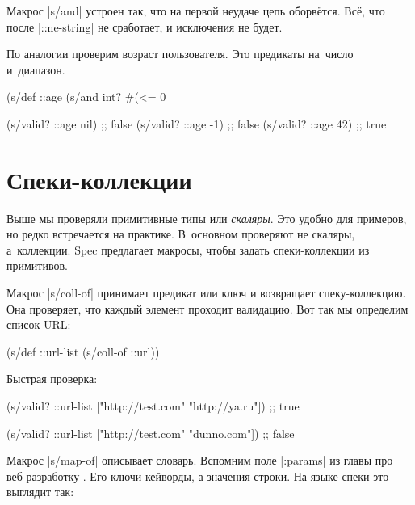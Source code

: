 Макрос \spverb|s/and| устроен так, что на первой неудаче цепь
оборв\"{е}тся. Вс\"{е}, что после \spverb|::ne-string| не сработает, и
исключения не будет.

По аналогии проверим возраст пользователя. Это предикаты на~число и~диапазон.


\begin{english}
  \begin{clojure}
(s/def ::age
  (s/and int? #(<= 0 %

(s/valid? ::age nil) ;; false
(s/valid? ::age -1)  ;; false
(s/valid? ::age 42)  ;; true
  \end{clojure}
\end{english}

\section{Спеки-коллекции}


Выше мы проверяли примитивные типы или \emph{скаляры}. Это удобно для примеров,
но редко встречается на практике. В~основном проверяют не скаляры,
а~коллекции. Spec предлагает макросы, чтобы задать спеки-коллекции из
примитивов.


Макрос \spverb|s/coll-of| принимает предикат или ключ и возвращает
спеку-коллекцию. Она проверяет, что каждый элемент проходит валидацию. Вот так
мы определим список URL:

\begin{english}
  \begin{clojure}
(s/def ::url-list (s/coll-of ::url))
  \end{clojure}
\end{english}

\noindent
Быстрая проверка:

\begin{english}
  \begin{clojure}
(s/valid? ::url-list ["http://test.com" "http://ya.ru"])
;; true

(s/valid? ::url-list ["http://test.com" "dunno.com"])
;; false
  \end{clojure}
\end{english}


Макрос \spverb|s/map-of| описывает словарь. Вспомним поле \spverb|:params| из
главы про веб-разработку . Его ключи кейворды, а значения
строки. На языке спеки это выглядит так:

